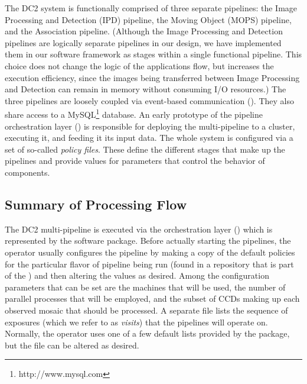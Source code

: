 The DC2 system is functionally comprised of three separate pipelines:
the Image Processing and Detection (IPD) pipeline, the Moving Object
(MOPS) pipeline, and the Association pipeline.  (Although the Image
Processing and Detection pipelines are logically separate pipelines in
our design, we have implemented them in our software framework as
stages within a single functional pipeline.  This choice does not
change the logic of the applications flow, but increases the execution
efficiency, since the images being transferred between Image
Processing and Detection can remain in memory without consuming I/O
resources.)  The three pipelines are loosely coupled via event-based
communication ().  They also share access to a
MySQL\footnote{http://www.mysql.com} database.  An early prototype of the pipeline
orchestration layer () is responsible for deploying
the multi-pipeline to a cluster, executing it, and feeding it its
input data.  The whole system is configured via a set of so-called
\textit{policy files}.  These define the different stages that make up
the pipelines and provide values for parameters that control the behavior
of components.

\subsection{Summary of Processing Flow}\label{sComp-flo}

The DC2 multi-pipeline is executed via the orchestration layer
() which is represented by the  software
package.  Before actually starting the pipelines, the operator usually
configures the pipeline by making a copy of the default policies for
the particular flavor of pipeline being run (found in a repository
that is part of the ) and then altering the values as
desired.  Among the configuration parameters that can be set are the machines that
will be used, the number of parallel processes that will be employed,
and the subset of CCDs making up each observed mosaic that should be
processed.  A separate file lists the sequence of exposures (which we
refer to as \textit{visits}) that the pipelines will operate on.
Normally, the operator uses one of a few default lists provided by the
 package, but the file can be altered as desired.

